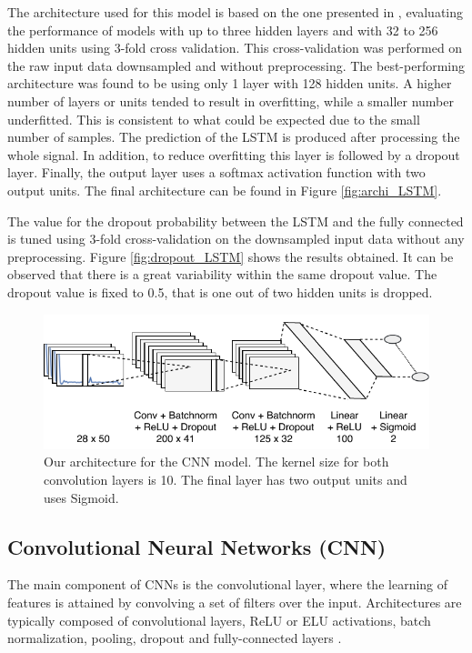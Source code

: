 \documentclass[10pt,conference,compsocconf]{IEEEtran}
\begin{document}
The architecture used for this model is based on the one presented in \cite{LSTM}, evaluating the performance of models with up to three hidden layers and with 32 to 256 hidden units using 3-fold cross validation. This cross-validation was performed on the raw input data downsampled and without preprocessing. The best-performing architecture was found to be using only 1 layer with 128 hidden units. A higher number of layers or units tended to result in overfitting, while a smaller number underfitted. This is consistent to what could be expected due to the small number of samples. The prediction of the LSTM is produced after processing the whole signal. In addition, to reduce overfitting this layer is followed by a dropout layer. Finally, the output layer uses a softmax activation function with two output units. The final architecture can be found in Figure \ref{fig:archi_LSTM}.

The value for the dropout probability between the LSTM and the fully connected is tuned using 3-fold cross-validation on the downsampled input data without any preprocessing. Figure \ref{fig:dropout_LSTM} shows the results obtained. It can be observed that there is a great variability within the same dropout value. The dropout value is fixed to 0.5, that is one out of two hidden units is dropped. 

\begin{figure}[t]
    \centering
    \includegraphics[width=\linewidth]{figures/CNN_archi.pdf}
    \caption{Our architecture for the CNN model. The kernel size for both convolution layers is 10. The final layer has two output units and uses Sigmoid.}
    \label{fig:archi_CNN}
\end{figure}

\subsection{Convolutional Neural Networks (CNN)}
\label{ssec:methods_CNN}
    The main component of CNNs is the convolutional layer, where the learning of features is attained by convolving a set of filters over the input. Architectures are typically composed of convolutional layers, ReLU or ELU activations, batch normalization, pooling, dropout and fully-connected layers \cite{LSTM}.
    
\end{document}
